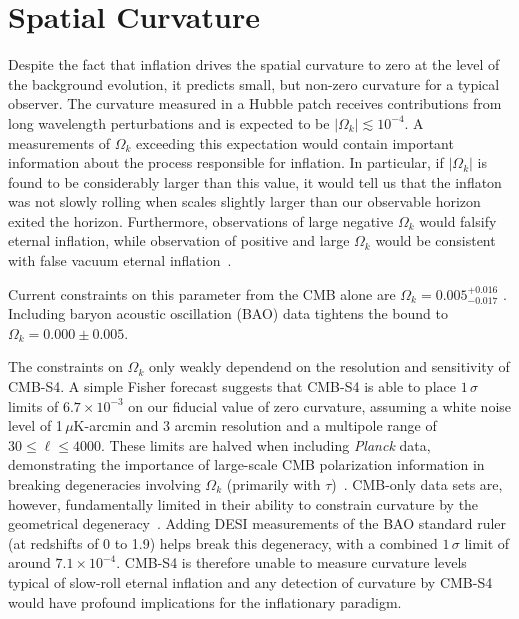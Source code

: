 \section{Spatial Curvature}
\label{sec:curvature}

Despite the fact that inflation drives the spatial curvature to zero at the level of the background evolution, it predicts small, but non-zero curvature for a typical observer. The curvature measured in a Hubble patch receives contributions from long wavelength perturbations and is expected to be $|\Omega_k|\lesssim10^{-4}$. A measurements of $\Omega_k$ exceeding this expectation would contain important information about the process responsible for inflation. In particular, if $|\Omega_k|$ is found to be considerably larger than this value, it would tell us that the inflaton was not slowly rolling when scales slightly larger than our observable horizon exited the horizon. Furthermore, observations of large negative $\Omega_k$ would falsify eternal inflation, while observation of positive and large $\Omega_k$ would be consistent with false vacuum eternal inflation~\cite{Guth:2012ww,Kleban:2012ph}.

Current constraints on this parameter from the CMB alone are $\Omega_k= 0.005^{+0.016}_{-0.017}$ \cite{Ade:2015xua}. Including baryon acoustic oscillation (BAO) data tightens the bound to $\Omega_k=0.000\pm0.005$.%


The constraints on $\Omega_k$ only weakly dependend on the resolution and sensitivity of CMB-S4. A simple Fisher forecast suggests that CMB-S4 is able to place $1\,\sigma$ limits of $6.7\times10^{-3}$ on our fiducial value of zero curvature, assuming a white noise level of 1$\,\mu$K-arcmin and 3 arcmin resolution and a multipole range of $30\leq\ell\leq 4000$. These limits are halved when including {\it Planck\/} data, demonstrating the importance of large-scale CMB polarization information in breaking degeneracies involving $\Omega_k$ (primarily with $\tau$)~\cite{Leonard:2016evk}. CMB-only data sets are, however, fundamentally limited in their ability to constrain curvature by the geometrical degeneracy~\cite{Zaldarriaga:1997ch,Bond:1997wr}. Adding DESI measurements of the BAO standard ruler (at redshifts of 0 to 1.9) helps break this degeneracy, with a combined $1\,\sigma$ limit of around $7.1\times10^{-4}$. CMB-S4 is therefore unable to measure curvature levels typical of slow-roll eternal inflation and any detection of curvature by CMB-S4 would have profound implications for the inflationary paradigm.

